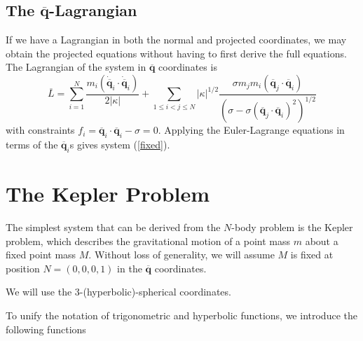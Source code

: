 \documentclass[12pt]{amsart}
\theoremstyle{definition}
\newcommand {\q} {\mathbf{q}}
\begin{document}
{%
\subsection{The $\overline{\q}$-Lagrangian}

If we have a Lagrangian in both the normal and projected coordinates, we may obtain the projected equations without having to first derive the full equations. The Lagrangian of the system in $\overline{\q}$ coordinates is
\begin{equation}\label{barLagrange}
\overline{L}=\sum\limits_{i=1}^N\frac{m_i(\dot{\overline{\q}}_i\cdot \dot{\overline{\q}}_i)}{2|\kappa|}+\sum\limits_{1\leq i<j\leq N}|\kappa|^{1/2}\frac{\sigma m_j m_i (\overline{\q}_j \cdot \overline{\q}_i)}{(\sigma-\sigma (\overline{\q}_j \cdot \overline{\q}_i)^2)^{1/2}}\end{equation}
with constraints $f_i=\overline{\q}_i \cdot \overline{\q}_i-\sigma=0$. Applying the Euler-Lagrange equations in terms of the $\overline{\q}_i$s gives system (\ref{fixed}).


\section{The Kepler Problem}

The simplest system that can be derived from the $N$-body problem is the Kepler problem, which describes the gravitational motion of a point mass $m$ about a fixed point mass $M$. Without loss of generality, we will assume $M$ is fixed at position $N=(0,0,0,1)$ in the $\overline{\q}$ coordinates. 

We will use the 3-(hyperbolic)-spherical coordinates. 

To unify the notation of trigonometric and hyperbolic functions, we introduce the following functions 




}
\end{document}
